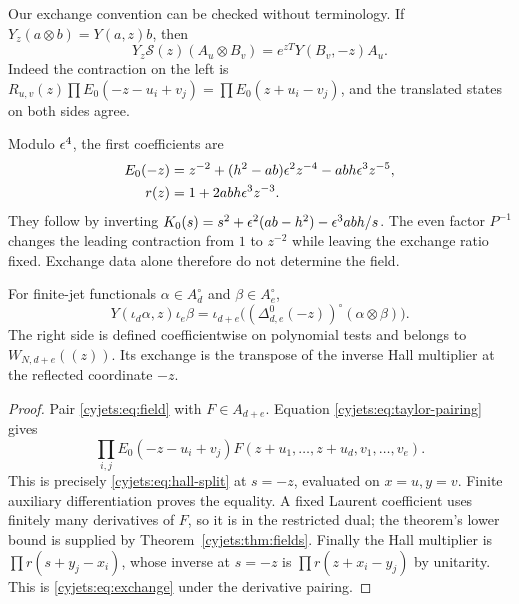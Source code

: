 Our exchange convention can be checked without terminology. If
$Y_z(a\otimes b)=Y(a,z)b$, then
\begin{equation}\label{cyjets:eq:skew}
 Y_z\mathcal S(z)(A_u\otimes B_v)
       =e^{zT}Y(B_v,-z)A_u.
\end{equation}
Indeed the contraction on the left is
$R_{u,v}(z)\prod E_0(-z-u_i+v_j)=\prod E_0(z+u_i-v_j)$,
and the translated states on both sides agree.

Modulo $\epsilon^4$, the first coefficients are
\begin{equation}\label{cyjets:eq:cubic}
 \begin{aligned}
 E_0(-z)&=z^{-2}+(h^2-ab)\epsilon^2z^{-4}-abh\epsilon^3z^{-5},\\
 r(z)&=1+2abh\epsilon^3z^{-3}.
 \end{aligned}
\end{equation}
They follow by inverting
$K_0(s)=s^2+\epsilon^2(ab-h^2)-\epsilon^3abh/s$.
The even factor $P^{-1}$ changes the leading contraction from $1$
to $z^{-2}$ while leaving the exchange ratio fixed. Exchange data
alone therefore do not determine the field.

\begin{theorem}\label{cyjets:thm:transpose}
For finite-jet functionals $\alpha\in A_d^\circ$ and
$\beta\in A_e^\circ$,
\begin{equation}\label{cyjets:eq:transpose}
 Y(\iota_d\alpha,z)\iota_e\beta
 =\iota_{d+e}\bigl((\Delta^0_{d,e}(-z))^\circ
                                    (\alpha\otimes\beta)\bigr).
\end{equation}
The right side is defined coefficientwise on polynomial tests and
belongs to $W_{N,d+e}((z))$. Its exchange is the transpose of the
inverse Hall multiplier at the reflected coordinate $-z$.
\end{theorem}
\begin{proof}
Pair \eqref{cyjets:eq:field} with $F\in A_{d+e}$. Equation
\eqref{cyjets:eq:taylor-pairing} gives
\[
 \prod_{i,j}E_0(-z-u_i+v_j)F(z+u_1,\ldots,z+u_d,v_1,\ldots,v_e).
\]
This is precisely \eqref{cyjets:eq:hall-split} at $s=-z$,
evaluated on $x=u,y=v$. Finite auxiliary differentiation proves
the equality. A fixed Laurent coefficient uses finitely many
derivatives of $F$, so it is in the restricted dual; the theorem's
lower bound is supplied by Theorem~\ref{cyjets:thm:fields}.
Finally the Hall multiplier is $\prod r(s+y_j-x_i)$, whose inverse
at $s=-z$ is $\prod r(z+x_i-y_j)$ by unitarity. This is
\eqref{cyjets:eq:exchange} under the derivative pairing.
\end{proof}

